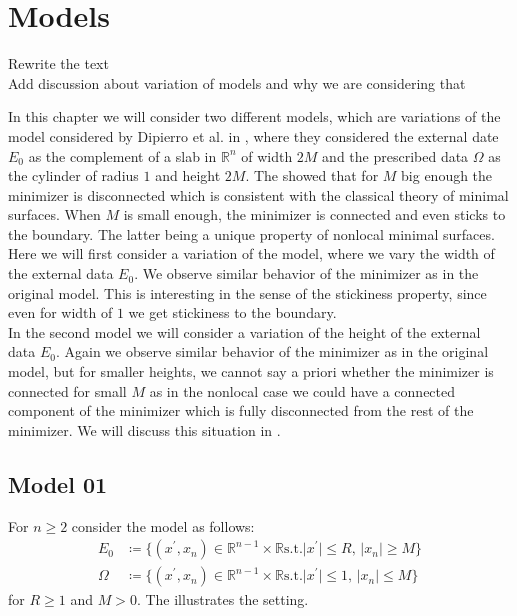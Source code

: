\chapter{Models}
\label{ch:models}

\begin{TODO}
	Rewrite the text \\
	Add discussion about variation of models and why we are considering that
\end{TODO}

In this chapter we will consider two different models, which are variations of the model
considered by Dipierro et al. in \cite{dipierro2020disconnectedness}, where they
considered the external date \( E_0 \) as the complement of a slab in \( \mathbb{R}^n \)
of width \( 2M \) and the prescribed data \( \Omega \) as the cylinder of radius \( 1 \)
and height \( 2M \). The showed that for \( M \) big enough the minimizer is disconnected
which is consistent with the classical theory of minimal surfaces. When \( M \) is small
enough, the minimizer is connected and even sticks to the boundary. The latter being a
unique property of nonlocal minimal surfaces. \\ Here we will first consider a variation
of the model, where we vary the width of the external data \( E_0 \). We observe similar
behavior of the minimizer as in the original model. This is interesting in the sense of
the stickiness property, since even for width of \( 1 \) we get stickiness to the
boundary. \\ In the second model we will consider a variation of the height of the
external data \( E_0 \). Again we observe similar behavior of the minimizer as in the
original model, but for smaller heights, we cannot say a priori whether the minimizer is
connected for small \( M \) as in the nonlocal case we could have a connected component of
the minimizer which is fully disconnected from the rest of the minimizer. We will discuss
this situation in .


\section{Model 01}
\label{sec:model01}


For \( n \geq 2 \) consider the model as follows:
\begin{align*}
	E_0    & \coloneqq \{(x^\prime, x_n) \in \mathbb{R}^{n - 1} \times \mathbb{R} \text{s.t.} \lvert x^\prime \rvert \leq R, \, \lvert x_n \rvert \geq M \} \\
	\Omega & \coloneqq \{(x^\prime, x_n) \in \mathbb{R}^{n - 1} \times \mathbb{R} \text{s.t.} \lvert x^\prime \rvert \leq 1, \, \lvert x_n \rvert \leq M \}
\end{align*}
for \( R \geq 1 \) and \( M > 0 \). The  illustrates the setting.

